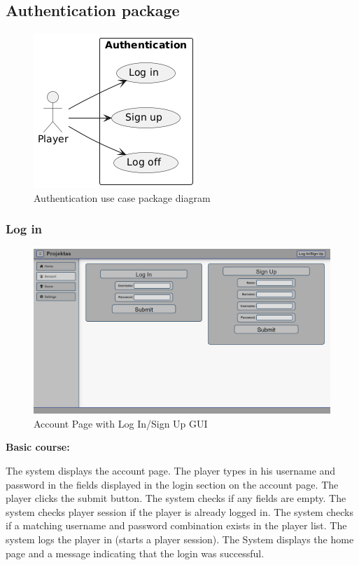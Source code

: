 \documentclass[11pt,a4paper]{article}
\newcommand{\heading}[1]{\vspace{1em}\noindent\textbf{#1}\par\vspace{0.5em}}
\begin{document}
\subsection{Authentication package}

\begin{figure}[H]
    \centering
    \includegraphics[keepaspectratio]{PSI_3rd_trial/packages/use_case_account.png}
    \caption{Authentication use case package diagram}
    \label{fig:authentication_package}
\end{figure}

\subsubsection{Log in}

\begin{figure}[H]
    \centering
    \includegraphics[width=1\textwidth,keepaspectratio]{PSI_3rd_trial/PNGs/log_in__signup.png}
    \caption{Account Page with Log In/Sign Up GUI}
    \label{fig:log_in}
\end{figure}

\heading{Basic course:}
The system displays the account page. The player types in his username and password in the fields displayed in the login section on the account page. The player clicks the submit button. The system checks if any fields are empty. The system checks player session if the player is already logged in. The system checks if a matching username and password combination exists in the player list. The system logs the player in (starts a player session). The System displays the home page and a message indicating that the login was successful.
\end{document}
